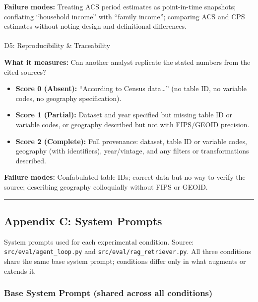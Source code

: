 \documentclass[
  11pt,
  letterpaper,
]{article}
\makeatletter
\let\oldparagraph\paragraph
\renewcommand{\paragraph}{
    \@ifstar
      \xxxParagraphStar
      \xxxParagraphNoStar
  }
\newcommand{\xxxParagraphStar}[1]{\oldparagraph*{#1}\mbox{}}
\newcommand{\xxxParagraphNoStar}[1]{\oldparagraph{#1}\mbox{}}
\providecommand{\tightlist}{%
  \setlength{\itemsep}{0pt}\setlength{\parskip}{0pt}}
\makeatother
\begin{document}
\textbf{Failure modes:} Treating ACS period estimates as point-in-time
snapshots; conflating ``household income'' with ``family income'';
comparing ACS and CPS estimates without noting design and definitional
differences.

\paragraph{D5: Reproducibility \&
Traceability}\label{d5-reproducibility-traceability}

\textbf{What it measures:} Can another analyst replicate the stated
numbers from the cited sources?

\begin{itemize}
\tightlist
\item
  \textbf{Score 0 (Absent):} ``According to Census data\ldots{}'' (no
  table ID, no variable codes, no geography specification).
\item
  \textbf{Score 1 (Partial):} Dataset and year specified but missing
  table ID or variable codes, or geography described but not with
  FIPS/GEOID precision.
\item
  \textbf{Score 2 (Complete):} Full provenance: dataset, table ID or
  variable codes, geography (with identifiers), year/vintage, and any
  filters or transformations described.
\end{itemize}

\textbf{Failure modes:} Confabulated table IDs; correct data but no way
to verify the source; describing geography colloquially without FIPS or
GEOID.

\begin{center}\rule{0.5\linewidth}{0.5pt}\end{center}

\subsection{Appendix C: System Prompts}\label{appendix-c-system-prompts}

System prompts used for each experimental condition. Source:
\texttt{src/eval/agent\_loop.py} and
\texttt{src/eval/rag\_retriever.py}. All three conditions share the same
base system prompt; conditions differ only in what augments or extends
it.

\subsubsection{Base System Prompt (shared across all
conditions)}\label{base-system-prompt-shared-across-all-conditions}
\end{document}
